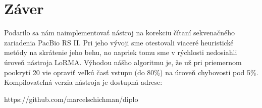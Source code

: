 \chapter*{Záver}

Podarilo sa nám naimplementovať nástroj na korekciu čítaní sekvenačného zariadenia PacBio RS II. Pri jeho vývoji sme otestovali viaceré heuristické metódy na skrátenie jeho behu, no napriek tomu sme v rýchlosti nedosiahli úroveň nástroja LoRMA. Výhodou nášho algoritmu je, že už pri priemernom pookrytí 20 vie opraviť veľkú časť vstupu (do 80\%) na úroveň chybovosti pod 5\%.
Kompilovateľná verzia nástroja je dostupná adrese:

https://github.com/marcelschichman/diplo
